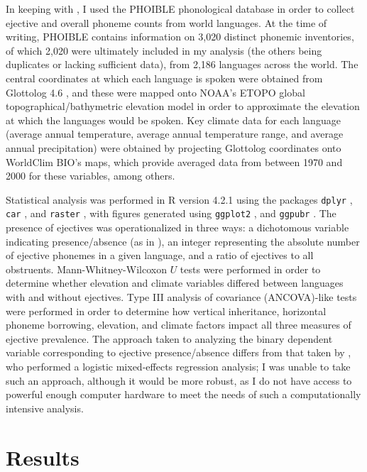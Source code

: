 \documentclass{article}
\begin{document}
In keeping with \textcite{urban2021}, I used the PHOIBLE phonological database \parencite{phoible} in order to collect ejective and overall phoneme counts from world languages. At the time of writing, PHOIBLE contains information on 3,020 distinct phonemic inventories, of which 2,020 were ultimately included in my analysis (the others being duplicates or lacking sufficient data), from 2,186 languages across the world. The central coordinates at which each language is spoken were obtained from Glottolog 4.6 \parencite{glottolog}, and these were mapped onto NOAA's ETOPO global topographical/bathymetric elevation model \parencite{etopo} in order to approximate the elevation at which the languages would be spoken. Key climate data for each language (average annual temperature, average annual temperature range, and average annual precipitation) were obtained by projecting Glottolog coordinates onto WorldClim BIO's \parencite{worldclim} maps, which provide averaged data from between 1970 and 2000 for these variables, among others.

Statistical analysis was performed in R version 4.2.1 \parencite{R} using the packages \texttt{dplyr} \parencite{dplyr}, \texttt{car} \parencite{car}, and \texttt{raster} \parencite{raster}, with figures generated using \texttt{ggplot2} \parencite{ggplot2}, and \texttt{ggpubr} \parencite{ggpubr}. The presence of ejectives was operationalized in three ways: a dichotomous variable indicating presence/absence (as in \cite{everett2013}), an integer representing the absolute number of ejective phonemes in a given language, and a ratio of ejectives to all obstruents. Mann-Whitney-Wilcoxon $U$ tests were performed in order to determine whether elevation and climate variables differed between languages with and without ejectives. Type III analysis of covariance (ANCOVA)-like tests were performed in order to determine how vertical inheritance, horizontal phoneme borrowing, elevation, and climate factors impact all three measures of ejective prevalence. The approach taken to analyzing the binary dependent variable corresponding to ejective presence/absence differs from that taken by \textcite{urban2021}, who performed a logistic mixed-effects regression analysis; I was unable to take such an approach, although it would be more robust, as I do not have access to powerful enough computer hardware to meet the needs of such a computationally intensive analysis. 

\section{Results}
\end{document}
